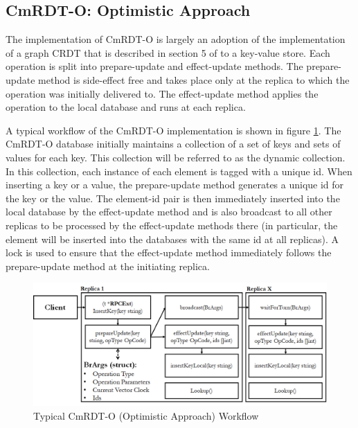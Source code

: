 \documentclass[sigconf,nonacm,10pt]{acmart}
\begin{document}
\subsection{CmRDT-O: Optimistic Approach}
The implementation of CmRDT-O is largely an adoption of the implementation of a graph CRDT that is described in section 5 of \cite{shapiro2011conflict} to a key-value store. Each operation is split into prepare-update and effect-update methods. The prepare-update method is side-effect free and takes place only at the replica to which the operation was initially delivered to. The effect-update method applies the operation to the local database and runs at each replica.

A typical workflow of the CmRDT-O implementation is shown in figure \ref{fig:cmrdtb}. The CmRDT-O database initially maintains a collection of a set of keys and sets of values for each key. This collection will be referred to as the dynamic collection. In this collection, each instance of each element is tagged with a unique id. When inserting a key or a value, the prepare-update method generates a unique id for the key or the value. The element-id pair is then immediately inserted into the local database by the effect-update method and is also broadcast to all other replicas to be processed by the effect-update methods there (in particular, the element will be inserted into the databases with the same id at all replicas). A lock is used to ensure that the effect-update method immediately follows the prepare-update method at the initiating replica.

\begin{figure}[h]
  \centering
  \includegraphics[width=15.5cm]{Fig4CmRDTB}
  \caption{Typical CmRDT-O (Optimistic Approach) Workflow}
  \label{fig:cmrdtb}
\end{figure}
\end{document}
